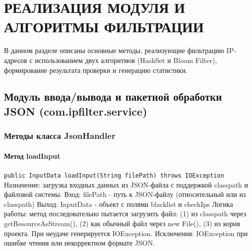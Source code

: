 \chapter{РЕАЛИЗАЦИЯ МОДУЛЯ И АЛГОРИТМЫ ФИЛЬТРАЦИИ} \label{ch2}

В данном разделе описаны основные методы, реализующие фильтрацию IP-адресов с использованием двух алгоритмов (HashSet и Bloom Filter), формирование результата проверки и генерацию статистики.



\section{Модуль ввода/вывода и пакетной обработки JSON (com.ipfilter.service)}

\subsection{ Методы класса JsonHandler}
\subsubsection{Метод loadInput}
\texttt{public InputData loadInput(String filePath) throws IOException}
Назначение: загрузка входных данных из JSON-файла с поддержкой classpath и файловой системы.
Вход: filePath - путь к JSON-файлу (относительный или из classpath)
Выход: InputData - объект с полями blacklist и checkIps
Логика работы: метод последовательно пытается загрузить файл: (1) из classpath через getResourceAsStream(), (2) как обычный файл через new File(), (3) из корня проекта. При неудаче генерируется IOException.
Исключения: IOException при ошибке чтения или некорректном формате JSON.

